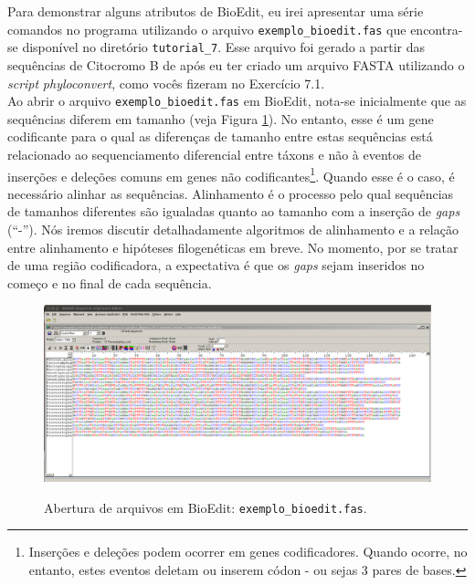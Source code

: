 \begin{refsection}

Para demonstrar alguns atributos de BioEdit, eu irei apresentar uma série comandos no programa utilizando o arquivo \texttt{exemplo\_bioedit.fas} que encontra-se disponível no diretório \texttt{tutorial\_7}. Esse arquivo foi gerado a partir das sequências de Citocromo B de \textcite{dias_et_al_2013} após eu ter criado um arquivo FASTA utilizando o \textit{script} \textit{phyloconvert}, como vocês fizeram no Exercício 7.1.\\

Ao abrir o arquivo \texttt{exemplo\_bioedit.fas} em BioEdit, nota-se inicialmente que as sequências diferem em tamanho (veja Figura \ref{tut7:fig:exemplo_1}). No entanto, esse é um gene codificante para o qual as diferenças de tamanho entre estas sequências está relacionado ao sequenciamento diferencial entre táxons e não à eventos de inserções e deleções comuns em genes não codificantes\footnote{Inserções e deleções podem ocorrer em genes codificadores. Quando ocorre, no entanto, estes eventos deletam ou inserem códon - ou sejas 3 pares de bases.}. Quando esse é o caso, é necessário alinhar as sequências. Alinhamento é o processo pelo qual sequências de tamanhos diferentes são igualadas quanto ao tamanho com a inserção de \textit{gaps} (``-''). Nós iremos discutir detalhadamente algoritmos de alinhamento e a relação entre alinhamento e hipóteses filogenéticas em breve. No momento, por se tratar de uma região codificadora, a expectativa é que os \textit{gaps} sejam inseridos no começo e no final de cada sequência.\\

  \begin{figure}[h!]
       \centering
      {\includegraphics[scale=0.3]{figures/tut7/exemplo_bioedit_1.eps}}
	{\caption[Bioedit: abertura de arquivos]{Abertura de arquivos em BioEdit: \texttt{exemplo\_bioedit.fas}.}\label{tut7:fig:exemplo_1}}
  \end{figure}


\end{refsection}
